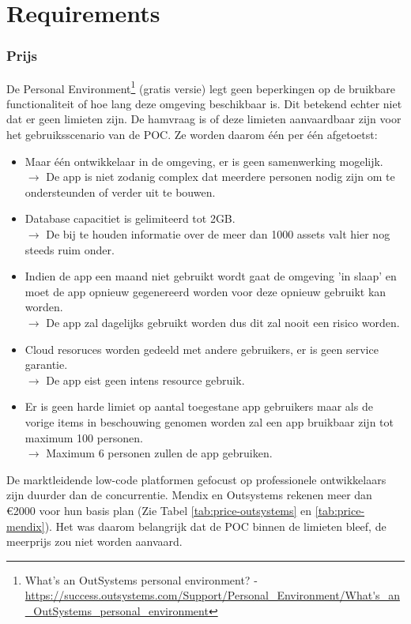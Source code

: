 \section{Requirements}

\subsubsection{Prijs}
\label{subsec:os-prijs}

De Personal Environment\footnote{What's an OutSystems personal environment? - \url{https://success.outsystems.com/Support/Personal_Environment/What's_an_OutSystems_personal_environment}} (gratis versie) legt geen beperkingen op de bruikbare functionaliteit of hoe lang deze omgeving beschikbaar is. Dit betekend echter niet dat er geen limieten zijn. De hamvraag is of deze limieten aanvaardbaar zijn voor het gebruiksscenario van de POC. Ze worden daarom één per één afgetoetst:

\begin{itemize}
    \item Maar één ontwikkelaar in de omgeving, er is geen samenwerking mogelijk.\\
    $\rightarrow$ De app is niet zodanig complex dat meerdere personen nodig zijn om te ondersteunden of verder uit te bouwen.
    \item Database capacitiet is gelimiteerd tot 2GB.\\
    $\rightarrow$ De bij te houden informatie over de meer dan 1000 assets valt hier nog steeds ruim onder.
    \item Indien de app een maand niet gebruikt wordt gaat de omgeving 'in slaap' en moet de app opnieuw gegenereerd worden voor deze opnieuw gebruikt kan worden.\\
    $\rightarrow$ De app zal dagelijks gebruikt worden dus dit zal nooit een risico worden.
    \item Cloud resoruces worden gedeeld met andere gebruikers, er is geen service garantie.\\
    $\rightarrow$ De app eist geen intens resource gebruik. 
    \item Er is geen harde limiet op aantal toegestane app gebruikers maar als de vorige items in beschouwing genomen worden zal een app bruikbaar zijn tot maximum 100 personen.\\
    $\rightarrow$ Maximum 6 personen zullen de app gebruiken.
\end{itemize}

De marktleidende low-code platformen gefocust op professionele ontwikkelaars zijn duurder dan de concurrentie. Mendix en Outsystems rekenen meer dan \euro2000 voor hun basis plan (Zie Tabel \ref{tab:price-outsystems} en \ref{tab:price-mendix}). Het was daarom belangrijk dat de POC binnen de limieten bleef, de meerprijs zou niet worden aanvaard.

